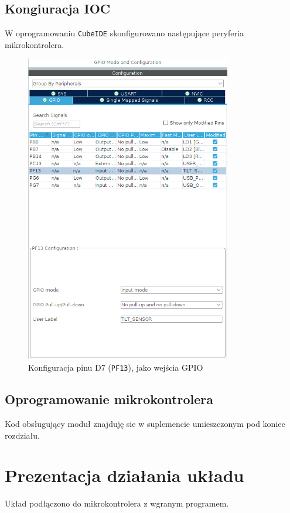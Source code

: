 \documentclass[11pt, a4paper]{article}
\begin{document}
\newpage

\subsection{Kongiuracja IOC}
W oprogramowaniu \texttt{CubeIDE} skonfigurowano następujące peryferia mikrokontrolera.

\vspace{0.5cm}
\begin{figure}[h!]
    \centering
    \includegraphics[width=9cm]{fig/KY-017/polaczenie_modulu/gpio.png}
    \caption{Konfiguracja pinu D7 (\texttt{PF13}), jako wejścia GPIO}
    \label{fig:gpio}
\end{figure}
\vspace{0.5cm}

\subsection{Oprogramowanie mikrokontrolera}
Kod obsługujący moduł znajduję sie w suplemencie umieszczonym pod koniec rozdziału.

\newpage

\section{Prezentacja działania układu}
Układ podłączono do mikrokontrolera z wgranym programem.
\end{document}
